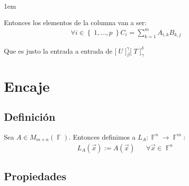 \documentclass[12pt, fleqn]{report}                             %
\newenvironment{SmallIndentation}[1][0.75em]                    %
        {\begin{adjustwidth}{#1}{}\begin{footnotesize}}             %
        {\end{footnotesize}\end{adjustwidth}}                       %
\DeclareMathOperator \Space {\quad}                             %
\theoremstyle{break}                                            %
\DeclareMathOperator \GenericField {\mathbb{F}}                 %
\newcommand{\Set}[1]    {\left\{ \; #1 \; \right\}}             %
\newcommand{\bigBrackets}[1] {\big[ \; #1 \; \big]}             %
\begin{document}
\begin{itemize}
\begin{SmallIndentation}[1em]
                            Entonces los elementos de la columna van a ser:
                            \begin{align*}
                                \forall i \in \Set{ 1, \dots, p } C_i = \sum_{k = 1}^m A_{i, k} B_{k, j}
                            \end{align*}

                            Que es justo la entrada a entrada de $\bigBrackets{U}_\beta^\gamma \bigBrackets{T}_\gamma^\delta$


                        
                        \end{SmallIndentation}
                            


                \end{itemize}



        \clearpage
        \section{Encaje}

            \subsection{Definición}

                Sea $A \in M_{m \times n}(\GenericField)$.
                Entonces definimos a $L_A: \GenericField^n \to \GenericField^m$:
                \begin{align*}
                    L_A(\vec x) := A(\vec x) \Space \forall \vec x \in \GenericField^n 
                \end{align*}





            \vspace{1em}
            \subsection{Propiedades}
\end{document}
